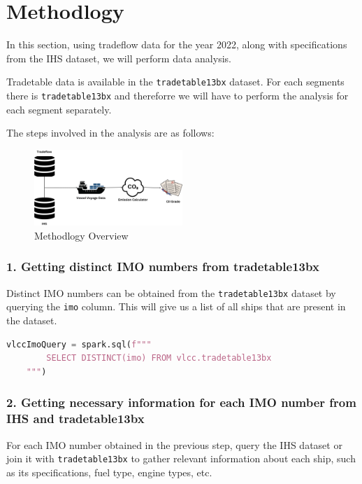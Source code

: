 \section{Methodlogy}


In this section, using tradeflow data for the year 2022, along with specifications from the IHS dataset, we will perform data analysis.

Tradetable data is available in the \texttt{tradetable13bx} dataset. For each segments there is \texttt{tradetable13bx} and thereforre we will have to perform the analysis for each segment separately.

The steps involved in the analysis are as follows:

\begin{figure}[h]
    \centering
    \includegraphics[width=0.5\textwidth]{images/methodlogy.png}
    \caption{Methodlogy Overview}
    \label{methodlogy}
\end{figure}

\newpage

\subsubsection{1. Getting distinct IMO numbers from tradetable13bx}

Distinct IMO numbers can be obtained from the \texttt{tradetable13bx} dataset by querying the \texttt{imo} column.
This will give us a list of all ships that are present in the dataset.

\begin{lstlisting}[language=python, caption=SQL Query to get distinct IMO]
    vlccImoQuery = spark.sql(f"""
        SELECT DISTINCT(imo) FROM vlcc.tradetable13bx
    """)
\end{lstlisting}

\subsubsection{2. Getting necessary information for each IMO number from IHS and tradetable13bx}
For each IMO number obtained in the previous step,
query the IHS dataset or join it with \texttt{tradetable13bx} to gather relevant information about each ship, such as its specifications, fuel type, engine types, etc.




